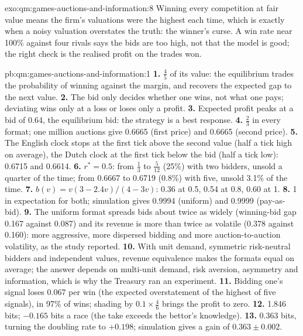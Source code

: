 \begin{solution}{exo:qm:games-auctions-and-information:8}
Winning every competition at fair value means the firm's valuations were the highest each time, which is exactly when a noisy valuation overstates the truth: the winner's curse. A win rate near 100\%
against four rivals says the bids are too high, not that the model is good; the right check is the realised profit on the trades won.
\end{solution}

\begin{solution}{pb:qm:games-auctions-and-information:1}
\textbf{1.} $\frac45$ of its value: the equilibrium trades the probability of winning against the margin, and recovers the expected gap to the next value.
\textbf{2.} The bid only decides whether one wins, not what one pays; deviating wins only at a loss or loses only a profit.
\textbf{3.} Expected profit peaks at a bid of 0.64, the equilibrium bid: the strategy is a best response.
\textbf{4.} $\frac23$ in every format; one million auctions give 0.6665 (first price) and 0.6665 (second price).
\textbf{5.} The English clock stops at the first tick above the second value (half a tick high on average), the Dutch clock at the first tick below the bid (half a tick low): 0.6715 and 0.6614.
\textbf{6.} $r^* = 0.5$: from $\frac13$ to $\frac5{12}$ (25\%) with two bidders, unsold a quarter of the time; from 0.6667 to 0.6719 (0.8\%) with five, unsold 3.1\% of the time.
\textbf{7.} $b(v) = v(3 - 2.4v)/(4 - 3v)$: 0.36 at 0.5, 0.54 at 0.8, 0.60 at 1.
\textbf{8.} 1 in expectation for both; simulation gives 0.9994 (uniform) and 0.9999 (pay-as-bid).
\textbf{9.} The uniform format spreads bids about twice as widely (winning-bid gap 0.167 against 0.087) and its revenue is more than twice as volatile (0.378 against 0.160): more aggressive, more dispersed bidding
and more auction-to-auction volatility, as the study reported.
\textbf{10.} With unit demand, symmetric risk-neutral bidders and independent values, revenue equivalence makes the formats equal on average; the answer depends on multi-unit demand, risk aversion, asymmetry and
information, which is why the Treasury ran an experiment.
\textbf{11.} Bidding one's signal loses 0.067 per win (the expected overstatement of the highest of five signals), in 97\% of wins; shading by $0.1 \times \frac46$ brings the profit to zero.
\textbf{12.} 1.846 bits; $-0.165$ bits a race (the take exceeds the bettor's knowledge).
\textbf{13.} 0.363 bits, turning the doubling rate to $+0.198$; simulation gives a gain of $0.363 \pm 0.002$.

\end{solution}
